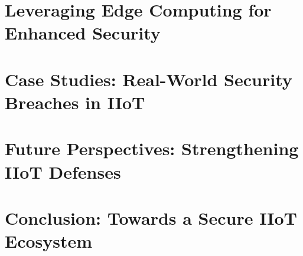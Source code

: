 \documentclass[article,a4paper]{IEEEtran}
\begin{document}
\section{Leveraging Edge Computing for Enhanced Security}

\section{Case Studies: Real-World Security Breaches in IIoT}

\section{Future Perspectives: Strengthening IIoT Defenses}

\section{Conclusion: Towards a Secure IIoT Ecosystem}

\printbibliography
\end{document}
